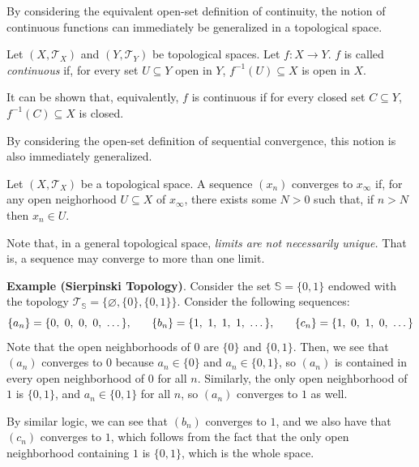 By considering the equivalent open-set definition of continuity, the notion of continuous functions can immediately be generalized in a topological space. 
\begin{shaded}
    Let $(X,\mathcal{T}_X)$ and $(Y,\mathcal{T}_Y)$ be topological spaces. Let $f:X\to Y$. $f$ is called \textit{continuous} if, for every set $U\subseteq Y$ open in $Y$, $f^{-1}(U)\subseteq X$ is open in $X$.

    It can be shown that, equivalently, $f$ is continuous if for every closed set $C\subseteq Y$, $f^{-1}(C)\subseteq X$ is closed. 
\end{shaded}
\vspace{-1em}
By considering the open-set definition of sequential convergence, this notion is also immediately generalized.
\begin{shaded}
    Let $(X,\mathcal{T}_X)$ be a topological space. A sequence $(x_n)$ converges to $x_\infty$ if, for any open neighorhood $U\subseteq X$ of $x_\infty$, there exists some $N>0$ such that, if $n>N$ then $x_n\in U$.

    Note that, in a general topological space, \textit{limits are not necessarily unique.} That is, a sequence may converge to more than one limit.

    \textbf{Example (Sierpinski Topology)}. Consider the set $\mathbb{S}=\{0,1\}$ endowed with the topology $\mathcal{T}_\mathbb{S} = \{\varnothing, \{0\}, \{0,1\}\}$. Consider the following sequences: \[\{a_n\} = \{0,\ 0,\ 0,\ 0,\ \dots\},\hspace{0.25in}\{b_n\} = \{1,\ 1,\ 1,\ 1,\ \dots\},\hspace{0.25in} \{c_n\}= \{1,\ 0,\ 1,\ 0,\ \dots\}\] Note that the open neighborhoods of $0$ are $\{0\}$ and $\{0,1\}$. Then, we see that $(a_n)$ converges to $0$ because $a_n\in \{0\}$ and $a_n\in \{0,1\}$, so $(a_n)$ is contained in every open neighborhood of $0$ for all $n$. Similarly, the only open neighborhood of $1$ is $\{0,1\}$, and $a_n\in \{0,1\}$ for all $n$, so $(a_n)$ converges to $1$ as well.

    By similar logic, we can see that $(b_n)$ converges to $1$, and we also have that $(c_n)$ converges to $1$, which follows from the fact that the only open neighborhood containing $1$ is $\{0,1\}$, which is the whole space.
\end{shaded}

